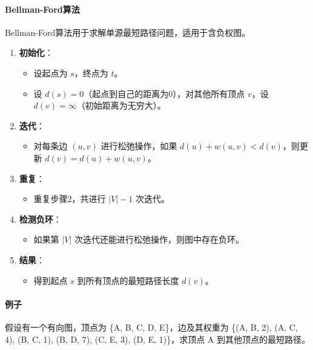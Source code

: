 \documentclass[UTF8]{ctexart}
\begin{document}
\paragraph{Bellman-Ford算法}
Bellman-Ford算法用于求解单源最短路径问题，适用于含负权图。
\begin{enumerate}
    \item \textbf{初始化}：
        \begin{itemize}
            \item 设起点为 \( s \)，终点为 \( t \)。
            \item 设 \( d(s) = 0 \)（起点到自己的距离为0），对其他所有顶点 \( v \)，设 \( d(v) = \infty \)（初始距离为无穷大）。
        \end{itemize}
    \item \textbf{迭代}：
        \begin{itemize}
            \item 对每条边 \( (u, v) \) 进行松弛操作，如果 \( d(u) + w(u, v) < d(v) \)，则更新 \( d(v) = d(u) + w(u, v) \)。
        \end{itemize}
    \item \textbf{重复}：
        \begin{itemize}
            \item 重复步骤2，共进行 \( |V| - 1 \) 次迭代。
        \end{itemize}
    \item \textbf{检测负环}：
        \begin{itemize}
            \item 如果第 \( |V| \) 次迭代还能进行松弛操作，则图中存在负环。
        \end{itemize}
    \item \textbf{结果}：
        \begin{itemize}
            \item 得到起点 \( s \) 到所有顶点的最短路径长度 \( d(v) \)。
        \end{itemize}
\end{enumerate}

\paragraph{例子}

\begin{raggedright}
假设有一个有向图，顶点为 \{A, B, C, D, E\}，边及其权重为 \{(A, B, 2), (A, C, 4), (B, C, 1), (B, D, 7), (C, E, 3), (D, E, 1)\}，求顶点 A 到其他顶点的最短路径。
\end{raggedright}
\end{document}
